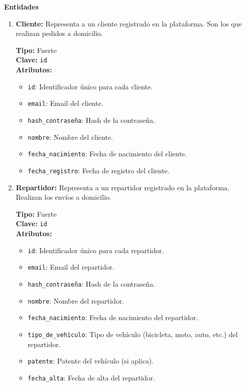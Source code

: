\textbf{Entidades}
\begin{enumerate}
    \item \textbf{Cliente:} Representa a un cliente registrado en la plataforma. Son los que realizan pedidos a domicilio.
    
    \textbf{Tipo:} Fuerte \\
    \textbf{Clave:} \texttt{id} \\
    \textbf{Atributos:}
    \begin{itemize}
        \item \texttt{id}: Identificador único para cada cliente.
        \item \texttt{email}: Email del cliente.
        \item \texttt{hash\_contraseña}: Hash de la contraseña.
        \item \texttt{nombre}: Nombre del cliente.
        \item \texttt{fecha\_nacimiento}: Fecha de nacimiento del cliente.
        \item \texttt{fecha\_registro}: Fecha de registro del cliente.
    \end{itemize}

    \item \textbf{Repartidor:} Representa a un repartidor registrado en la plataforma. Realizan los envíos a domicilio.
    
    \textbf{Tipo:} Fuerte \\
    \textbf{Clave:} \texttt{id} \\
    \textbf{Atributos:}
    \begin{itemize}
        \item \texttt{id}: Identificador único para cada repartidor.
        \item \texttt{email}: Email del repartidor.
        \item \texttt{hash\_contraseña}: Hash de la contraseña.
        \item \texttt{nombre}: Nombre del repartidor.
        \item \texttt{fecha\_nacimiento}: Fecha de nacimiento del repartidor.
        \item \texttt{tipo\_de\_vehículo}: Tipo de vehículo (bicicleta, moto, auto, etc.) del repartidor.
        \item \texttt{patente}: Patente del vehículo (si aplica).
        \item \texttt{fecha\_alta}: Fecha de alta del repartidor.
    \end{itemize}
    

\end{enumerate}
